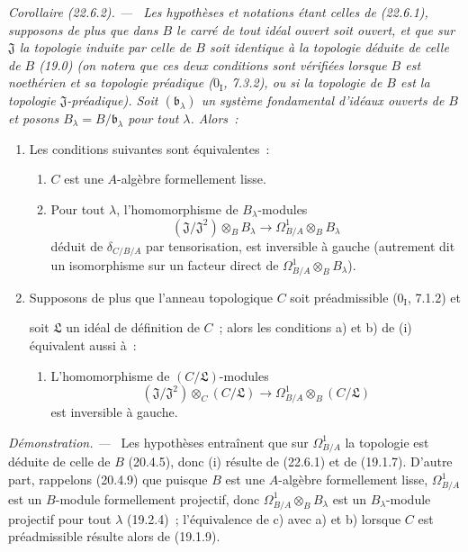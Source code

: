 \documentclass[10pt,oneside]{book}
\makeatletter
\newcommand{\setmanualcurrentlabel}[1]{\def\@currentlabel{#1}}
\newcommand{\oldpage}[2][]{%
  \setcounter{footnote}{0}%
  \marginpar{\scriptsize\textbf{#1}~|~#2}\ignorespaces}
\newenvironment{corollary}[1][]{%
  \setmanualcurrentlabel{#1}\par\medskip\noindent\itshape Corollaire (#1). ---\ }{\par}
\newenvironment{proof}{%
  \par\medskip\noindent\textit{Démonstration. ---\ }}{\par}
\makeatother
\begin{document}
\begin{corollary}[22.6.2]
\label{0.22.6.2-fr}
Les hypothèses et notations étant celles de (22.6.1), supposons de plus que
dans $B$ le carré de tout idéal ouvert soit ouvert, et que sur $\mathfrak J$ la
topologie induite par celle de $B$ soit identique à la topologie déduite de
celle de $B$ (19.0) (on notera que ces deux conditions sont vérifiées lorsque
$B$ est noethérien et sa topologie préadique ($0_{\mathrm I}$, 7.3.2), ou si la
topologie de $B$ est la topologie $\mathfrak J$-préadique). Soit
$(\mathfrak b_\lambda)$ un système fondamental d'idéaux ouverts de $B$ et
posons $B_\lambda=B/\mathfrak b_\lambda$ pour tout $\lambda$. Alors~:
\begin{enumerate}
  \item[\rm(i)] Les conditions suivantes sont équivalentes~:
  \begin{enumerate}
    \item[a)] $C$ est une $A$-algèbre formellement lisse.
    \item[b)] Pour tout $\lambda$, l'homomorphisme de $B_\lambda$-modules
    \begin{equation}
    \label{0.22.6.2.1-fr}
      (\mathfrak J/\mathfrak J^2)\otimes_BB_\lambda
      \longrightarrow\Omega^1_{B/A}\otimes_BB_\lambda
      \tag{22.6.2.1}
    \end{equation}
    déduit de $\delta_{C/B/A}$ par tensorisation, est inversible à gauche
    (autrement dit un isomorphisme sur un facteur direct de
    $\Omega^1_{B/A}\otimes_BB_\lambda$).
  \end{enumerate}
  \item[\rm(ii)] Supposons de plus que l'anneau topologique $C$ soit
  préadmissible ($0_{\mathrm I}$, 7.1.2) et

  \oldpage[0\textsubscript{IV-1}]{206}

  soit $\mathfrak L$ un idéal de définition de $C$~; alors les conditions a)
  et b) de (i) équivalent aussi à~:
  \begin{enumerate}
    \item[c)] L'homomorphisme de $(C/\mathfrak L)$-modules
    \[
      (\mathfrak J/\mathfrak J^2)\otimes_C(C/\mathfrak L)
      \longrightarrow\Omega^1_{B/A}\otimes_B(C/\mathfrak L)
    \]
    est inversible à gauche.
  \end{enumerate}
\end{enumerate}
\end{corollary}

\begin{proof}
Les hypothèses entraînent que sur $\Omega^1_{B/A}$ la topologie est déduite de
celle de $B$ (20.4.5), donc (i) résulte de (22.6.1) et de (19.1.7). D'autre
part, rappelons (20.4.9) que puisque $B$ est une $A$-algèbre formellement
lisse, $\Omega^1_{B/A}$ est un $B$-module formellement projectif, donc
$\Omega^1_{B/A}\otimes_BB_\lambda$ est un $B_\lambda$-module projectif pour
tout $\lambda$ (19.2.4)~; l'équivalence de c) avec a) et b) lorsque $C$ est
préadmissible résulte alors de (19.1.9).
\end{proof}
\end{document}
